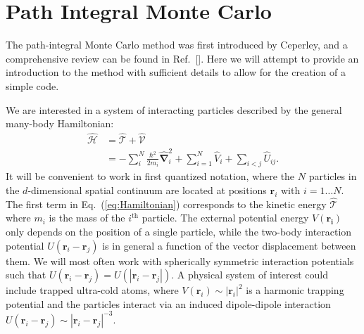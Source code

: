 \documentclass[prb,aps,amssym,nofootinbib,floatfix,notitlepage]{revtex4-1}
\renewcommand{\vec}[1]{\boldsymbol{#1}}
\renewcommand{\eqref}[1]{Eq.~(\ref{#1})}
\begin{document}
\section{Path Integral Monte Carlo}
The path-integral Monte Carlo method was first introduced by Ceperley, and a
comprehensive review can be found in Ref.~[]. Here
we will attempt to provide an introduction to the method with sufficient
details to allow for the creation of a simple code.

We are interested in a system of interacting particles described by the
general many-body Hamiltonian:
%
\begin{align}
    \hat{\mathcal{H}} &= \hat{\mathcal{T}} + \hat{\mathcal{V}} \nonumber \\
                      &= -\sum_i^N \frac{\hbar^2}{2m_i} \hat{\vec{\nabla}}_i^2 
    + \sum_{i=1}^N \hat{V}_{i} + \sum_{i < j} \hat{U}_{ij}.
\label{eq:Hamiltonian}
\end{align}
%
It will be convenient to work in first quantized notation, where the $N$
particles in the $d$-dimensional spatial continuum are located at positions
$\vec{r}_i$ with $i=1\ldots N$.  The first term in \eqref{eq:Hamiltonian}
corresponds to the kinetic energy $\hat{\mathcal{T}}$ where $m_i$ is the mass
of the $i^{\text{th}}$ particle. The external potential energy $V(\vec{r_i})$
only depends on the position of a single particle, while the two-body
interaction potential $U(\vec{r}_i-\vec{r}_j)$ is in general a function of the
vector displacement between them.  We will most often work with spherically
symmetric interaction potentials such that $U(\vec{r}_i - \vec{r}_j) =
U(|\vec{r}_i-\vec{r}_j|)$. A physical system of interest could include trapped
ultra-cold atoms, where $V(\vec{r}_i) \sim |\vec{r}_i|^2$ is a harmonic
trapping potential and the particles interact via an induced dipole-dipole
interaction $U(\vec{r}_i - \vec{r}_j) \sim |\vec{r}_i-\vec{r}_j|^{-3}$.
\end{document}
